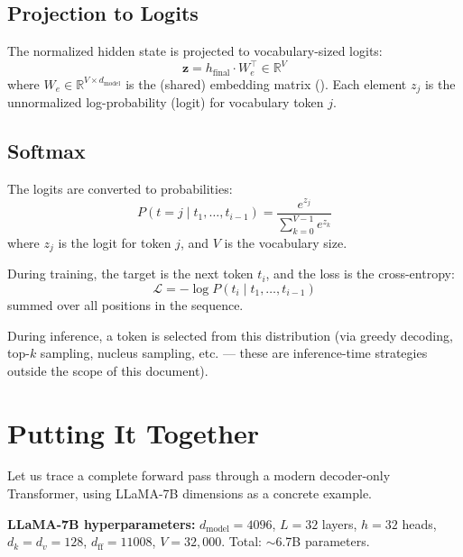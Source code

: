 \documentclass[11pt,a4paper]{article}
\newcommand{\R}{\mathbb{R}}
\newcommand{\dmodel}{d_{\text{model}}}
\newcommand{\dff}{d_{\text{ff}}}
\newcommand{\dk}{d_k}
\newcommand{\dv}{d_v}
\begin{document}
\subsection{Projection to Logits}

The normalized hidden state is projected to vocabulary-sized logits:
\begin{equation}
  \bm{z} = h_{\text{final}} \cdot W_e^\top \in \R^V
\end{equation}
where $W_e \in \R^{V \times \dmodel}$ is the (shared) embedding matrix
(). Each element $z_j$ is the unnormalized log-probability
(logit) for vocabulary token $j$.

\subsection{Softmax}

The logits are converted to probabilities:
\begin{equation}
  P(t = j \mid t_1, \ldots, t_{i-1}) = \frac{e^{z_j}}{\sum_{k=0}^{V-1} e^{z_k}}
\end{equation}
where $z_j$ is the logit for token $j$, and $V$ is the vocabulary size.

During training, the target is the next token $t_i$, and the loss is the cross-entropy:
\begin{equation}
  \mathcal{L} = -\log P(t_i \mid t_1, \ldots, t_{i-1})
\end{equation}
summed over all positions in the sequence.

During inference, a token is selected from this distribution (via greedy decoding, top-$k$
sampling, nucleus sampling, etc. --- these are inference-time strategies outside the scope
of this document).


\section{Putting It Together}
\label{sec:full-forward-pass}

Let us trace a complete forward pass through a modern decoder-only Transformer, using
LLaMA-7B dimensions \cite{touvron2023} as a concrete example.

\begin{dimbox}
\textbf{LLaMA-7B hyperparameters:}
$\dmodel = 4096$, $L = 32$ layers, $h = 32$ heads, $\dk = \dv = 128$,
$\dff = 11008$, $V = 32{,}000$. Total: $\sim$6.7B parameters.
\end{dimbox}
\end{document}
